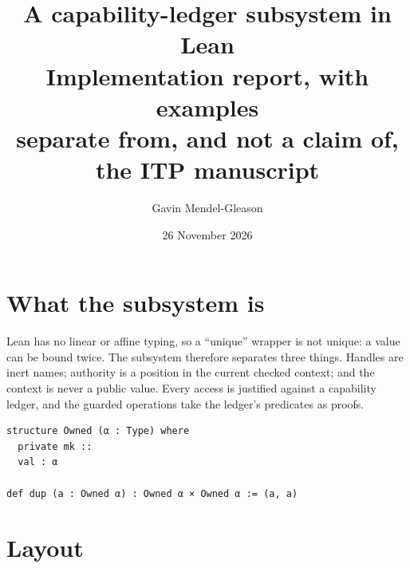 \documentclass[10pt,a4paper]{article}
\title{\vspace{-1.2cm}\textbf{A capability-ledger subsystem in Lean}\\[2pt]
\large Implementation report, with examples\\[4pt]
\normalsize separate from, and not a claim of, the ITP manuscript}
\author{Gavin Mendel-Gleason}
\date{26 November 2026}
\begin{document}
\maketitle
\vspace{-0.8cm}

\begin{center}
\end{center}

\section{What the subsystem is}

Lean has no linear or affine typing, so a ``unique'' wrapper is not unique: a value
can be bound twice. The subsystem therefore separates three things. Handles are
inert names; authority is a position in the current checked context; and the
context is never a public value. Every access is justified against a capability
ledger, and the guarded operations take the ledger's predicates as proofs.

\begin{lstlisting}[caption={Duplication is legal in the host, which is why authority cannot live in a wrapper.}]
structure Owned (α : Type) where
  private mk ::
  val : α

def dup (a : Owned α) : Owned α × Owned α := (a, a)
\end{lstlisting}

\section{Layout}
\end{document}
